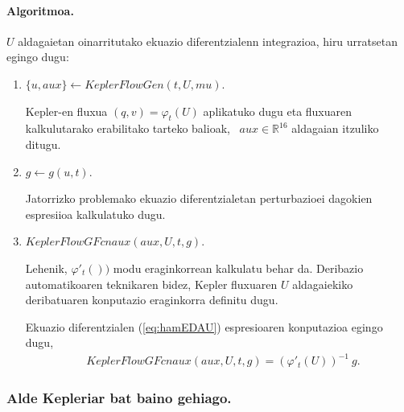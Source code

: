 \paragraph*{Algoritmoa.}
$U$ aldagaietan oinarritutako ekuazio diferentzialenn integrazioa, hiru urratsetan egingo dugu:
\begin{enumerate}
\item $\{u,aux\} \leftarrow KeplerFlowGen (t,U,mu)$.

Kepler-en fluxua $(q,v)= \varphi_t(U)$ aplikatuko dugu eta fluxuaren kalkulutarako erabilitako tarteko balioak, ~$aux\in \mathbb{R}^{16}$ aldagaian itzuliko ditugu. 

\item $g \leftarrow g(u,t)$.

Jatorrizko problemako ekuazio diferentzialetan perturbazioei dagokien espresiioa kalkulatuko dugu.

\item $KeplerFlowGFcnaux(aux,U,t,g)$.

Lehenik, $\varphi'_t())$ modu eraginkorrean kalkulatu behar da. Deribazio automatikoaren teknikaren bidez, Kepler fluxuaren $U$ aldagaiekiko deribatuaren konputazio eraginkorra definitu dugu. 

Ekuazio diferentzialen (\ref{eq:hamEDAU}) espresioaren konputazioa egingo dugu,   
\begin{align*}
&KeplerFlowGFcnaux(aux,U,t,g)= ( \varphi'_t(U))^{-1} \ g.
\end{align*}

\end{enumerate} 



\subsubsection*{Alde Kepleriar bat baino gehiago.}

